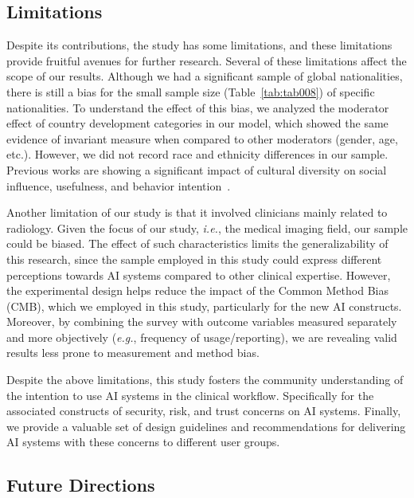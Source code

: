 \subsection{Limitations}
\label{sec:chap004006003}

Despite its contributions, the study has some limitations, and these limitations provide fruitful avenues for further research.
Several of these limitations affect the scope of our results.
Although we had a significant sample of global nationalities, there is still a bias for the small sample size (Table~\ref{tab:tab008}) of specific nationalities.
To understand the effect of this bias, we analyzed the moderator effect of country development categories in our model, which showed the same evidence of invariant measure when compared to other moderators (gender, age, etc.).
However, we did not record race and ethnicity differences in our sample.
Previous works are showing a significant impact of cultural diversity on social influence, usefulness, and behavior intention~\cite{Belanche2019, info:doi/10.2196/27122}.

Another limitation of our study is that it involved clinicians mainly related to radiology.
Given the focus of our study, {\it i.e.}, the medical imaging field, our sample could be biased.
The effect of such characteristics limits the generalizability of this research, since the sample employed in this study could express different perceptions towards AI systems compared to other clinical expertise.
However, the experimental design helps reduce the impact of the Common Method Bias (CMB), which we employed in this study, particularly for the new AI constructs.
Moreover, by combining the survey with outcome variables measured separately and more objectively ({\it e.g.}, frequency of usage/reporting), we are revealing valid results less prone to measurement and method bias.

Despite the above limitations, this study fosters the community understanding of the intention to use AI systems in the clinical workflow. Specifically for the associated constructs of security, risk, and trust concerns on AI systems.
Finally, we provide a valuable set of design guidelines and recommendations for delivering AI systems with these concerns to different user groups.

\subsection{Future Directions}
\label{sec:chap004006004}

